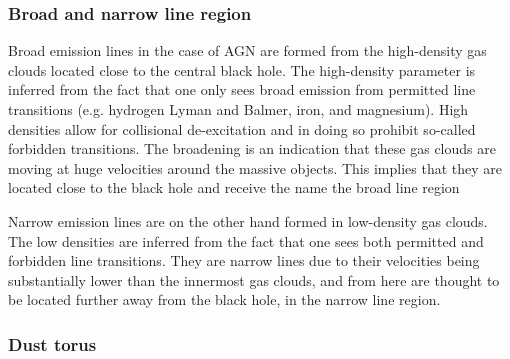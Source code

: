 



\subsubsection{Broad and narrow line region}

Broad emission lines in the case of AGN are formed from the high-density gas clouds located close to the central black hole. The 
high-density parameter is inferred from the fact that one only sees broad emission from permitted line transitions (e.g. hydrogen Lyman and Balmer,
iron, and magnesium). High densities allow for collisional de-excitation and in doing so prohibit so-called forbidden transitions.
The broadening is an indication that these gas clouds are moving at huge velocities around the massive objects. This implies that they are located close to the black hole and receive the name the broad line region

Narrow emission lines are on the other hand formed in low-density gas clouds. The low densities are inferred from the fact that one sees
both permitted and forbidden line transitions. They are narrow lines due to their velocities being substantially lower than the innermost gas clouds, and from here are thought to be located further away from the black hole, in the narrow line region. 


\subsubsection{Dust torus}

